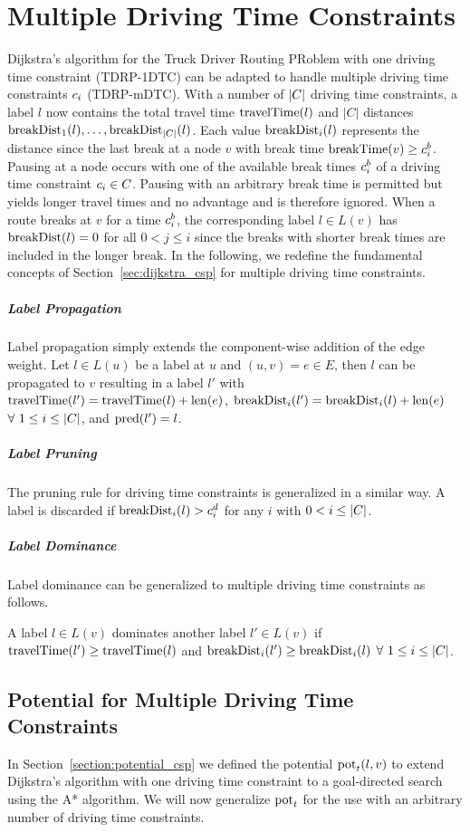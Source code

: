 \section{Multiple Driving Time Constraints\label{section:n_csp}}
Dijkstra's algorithm for the Truck Driver Routing PRoblem with one driving time constraint (TDRP-1DTC) can be adapted to handle multiple driving time constraints $c_i$ (TDRP-mDTC). With a number of $|C|$ driving time constraints, a label $l$ now contains the total travel time $\operatorname{travelTime}(l)$ and $|C|$ distances $\operatorname{breakDist}_1(l), \ldots , \operatorname{breakDist}_{|C|}(l)$. Each value $\operatorname{breakDist}_i(l)$ represents the distance since the last break at a node $v$ with break time $\operatorname{breakTime}(v) \ge c_i^b$. Pausing at a node occurs with one of the available break times $c_i^b$ of a driving time constraint $c_i \in C$. Pausing with an arbitrary break time is permitted but yields longer travel times and no advantage and is therefore ignored. When a route breaks at $v$ for a time $c_i^b$, the corresponding label $l \in L(v)$ has $\operatorname{breakDist}(l) = 0$ for all $0 < j \le i$ since the breaks with shorter break times are included in the longer break. In the following, we redefine the fundamental concepts of Section~\ref{sec:dijkstra_csp} for multiple driving time constraints.

\subparagraph{Label Propagation}
Label propagation simply extends the component-wise addition of the edge weight. Let $l \in L(u)$ be a label at $u$ and $(u,v) = e \in E$, then $l$ can be propagated to $v$ resulting in a label $l'$ with $\operatorname{travelTime}(l') = \operatorname{travelTime}(l) + \operatorname{len}(e)$, $\operatorname{breakDist}_i(l') = \operatorname{breakDist}_i(l) + \operatorname{len}(e)$ $\forall\ 1 \le i \le |C|$, and $\operatorname{pred}(l') = l$.

\subparagraph{Label Pruning}
The pruning rule for driving time constraints is generalized in a similar way. A label is discarded if $\operatorname{breakDist}_i(l) > c_i^d$ for any $i$ with $0 < i \le |C|$.


\subparagraph{Label Dominance}
Label dominance can be generalized to multiple driving time constraints as follows.

\begin{definition}
	A label $l \in L(v)$ dominates another label $l' \in L(v)$ if $\operatorname{travelTime}(l') \ge \operatorname{travelTime}(l)$ and $\operatorname{breakDist}_i(l') \ge \operatorname{breakDist}_i(l)$ $\forall\ 1 \le i \le |C|$.
\end{definition}

\subsection{Potential for Multiple Driving Time Constraints\label{section:potential_n_csp}}
In Section~\ref{section:potential_csp} we defined the potential $\operatorname{pot}_t(l,v)$ to extend Dijkstra's algorithm with one driving time constraint to a goal-directed search using the A* algorithm. We will now generalize $\operatorname{pot}_t$ for the use with an arbitrary number of driving time constraints.

